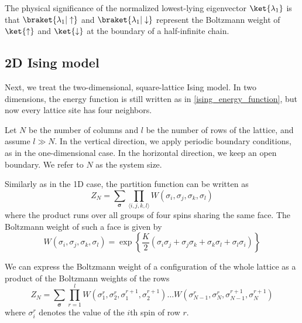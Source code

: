 The physical significance of the normalized lowest-lying eigenvector $\ket{\lambda_1}$ is
that
$\braket{\lambda_1 | \uparrow}$ and
$\braket{\lambda_1 | \downarrow}$ represent the Boltzmann weight of $\ket{\uparrow}$ and
$\ket{\downarrow}$ at the boundary of a half-infinite chain.

\subsection{2D Ising model}

Next, we treat the two-dimensional, square-lattice Ising model. In two
dimensions, the energy function is still written as in
\autoref{ising_energy_function}, but now every lattice site has four neighbors.

Let $N$ be the number of columns and $l$ be the number of rows of the lattice, and assume
$l \gg N$. In the vertical direction, we apply periodic boundary conditions, as in the
one-dimensional case. In the horizontal direction, we keep an open boundary. We refer to
$N$ as the system size. 

Similarly as in the 1D case, the partition function can be written as
\begin{equation}
  Z_N = \sum_{\bm{\sigma}} \prod_{\langle i, j, k, l \rangle} W(\sigma_i, \sigma_j, \sigma_k, \sigma_l)
\end{equation}
where the product runs over all groups of four spins sharing the same face. The Boltzmann weight of such a face is given by
\begin{equation}\label{eq:boltzmann_weight_face_ising_model}
  W(\sigma_i, \sigma_j, \sigma_k, \sigma_l) = \exp \left\{ \frac{K}{2} (\sigma_i \sigma_j + \sigma_j \sigma_k + \sigma_k \sigma_l + \sigma_l \sigma_i) \right\}
\end{equation}

We can express the Boltzmann weight of a configuration of the whole lattice as
a product of the Boltzmann weights of the rows
\begin{equation}
  Z_N = \sum_{\bm{\sigma}} \prod_{r = 1}^{l} W(\sigma_{1}^{r}, \sigma_{2}^{r}, \sigma_{1}^{r+1}, \sigma_{2}^{r+1}) \dots W(\sigma_{N-1}^{r}, \sigma_{N}^{r}, \sigma_{N-1}^{r+1}, \sigma_{N}^{r+1})
\end{equation}
where $\sigma_{i}^{r}$ denotes the value of the $i$th spin of row $r$.

